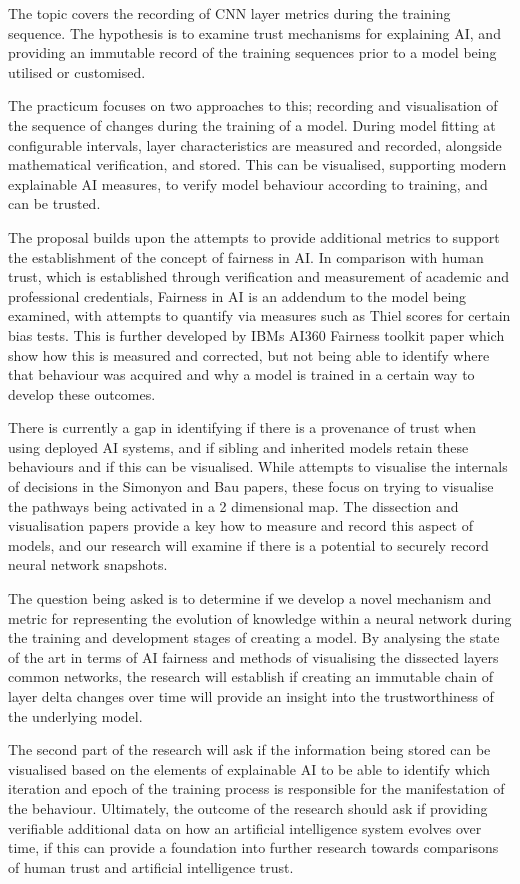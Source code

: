 The topic covers the recording of CNN layer metrics during the training
sequence. The hypothesis is to examine trust mechanisms for explaining AI, and
providing an immutable record of the training sequences prior to a model being
utilised or customised.

The practicum focuses on two approaches to this;
recording and visualisation of the sequence of changes during the training of a
model. During model fitting at configurable intervals, layer characteristics are
measured and recorded, alongside mathematical verification, and stored. This can
be visualised, supporting modern explainable AI measures, to verify model
behaviour according to training, and can be trusted.

The proposal builds upon the attempts to provide additional metrics to support
the establishment of the concept of fairness in AI. In comparison with human
trust, which is established through verification and measurement of academic and
professional credentials, Fairness in AI is an addendum to the model being
examined, with attempts to quantify via measures such as Thiel scores for
certain bias tests. This is further developed by IBMs AI360 Fairness toolkit
paper which show how this is measured and corrected, but not being able to
identify where that behaviour was acquired and why a model is trained in a
certain way to develop these outcomes.

There is currently a gap in identifying if there is a provenance of trust when using deployed AI systems, and if sibling
and inherited models retain these behaviours and if this can be visualised.
While attempts to visualise the internals of decisions in the Simonyon and Bau
papers, these focus on trying to visualise the pathways being activated in a 2
dimensional map. The dissection and visualisation papers provide a key how to
measure and record this aspect of models, and our research will examine if there
is a potential to securely record neural network snapshots.
 
The question being asked is to determine if we develop a novel mechanism and metric for
representing the evolution of knowledge within a neural network during the
training and development stages of creating a model. By analysing the state of
the art in terms of AI fairness and methods of visualising the dissected layers
common networks, the research will establish if creating an immutable chain of
layer delta changes over time will provide an insight into the trustworthiness
of the underlying model.

 The second part of the research will ask if the
information being stored can be visualised based on the elements of explainable
AI to be able to identify which iteration and epoch of the training process is
responsible for the manifestation of the behaviour. Ultimately, the outcome of
the research should ask if providing verifiable additional data on how an
artificial intelligence system evolves over time, if this can provide a
foundation into further research towards comparisons of human trust and
artificial intelligence trust.
